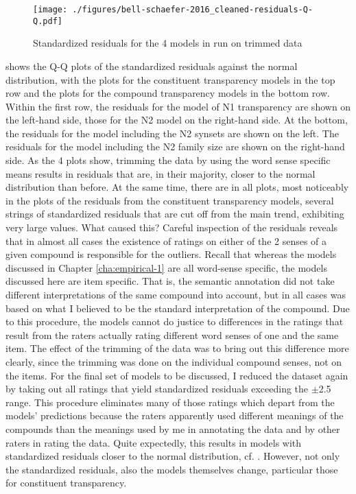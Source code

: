 \begin{figure}[!htb]
  \centering
\texttt{[image: ./figures/bell-schaefer-2016\_cleaned-residuals-Q-Q.pdf]}
  \caption{Standardized residuals for the 4 models in \citet{BellandSchaefer:2016} run on trimmed data}
\label{fig:bellschaefer2016_clean_models_residuals}
\end{figure}
\pagebreak[3]
 shows the Q-Q
plots of the standardized residuals against the normal distribution,
with the plots for the constituent transparency models in the top row
and the plots for the compound transparency models in the bottom
row. Within the first row, the residuals for the model of N1 transparency are shown on the left-hand
side, those for the N2 model on the right-hand side. At the bottom,
the residuals for the model including the N2 synsets are shown on the
left. The residuals for the model including the N2 family size are
shown on the right-hand side. 
As the 4 plots show, trimming the data by using the word sense
specific means results in residuals that are, in their majority,
closer to the normal distribution than before. At the same
time, there are in all plots, most noticeably in the plots of the
residuals from the constituent transparency models,
several strings of standardized residuals that are cut off from the main trend,
exhibiting very large values. What caused this? Careful inspection of
the residuals reveals that in almost all cases the existence of
ratings on either of the 2 senses of a given compound is responsible
for the outliers. Recall that whereas the models discussed in Chapter
\ref{cha:empirical-1} are all word-sense specific, the models
discussed here are item specific. That is, the semantic annotation did
not take different interpretations of the same compound into
account, but in all cases was based on what I believed to be the
standard interpretation of the compound. Due to this procedure, the
models cannot do justice to differences in the ratings that result
from the raters actually rating different word senses of one and the
same item. The effect of the trimming of the data was to bring out
this difference more clearly, since the trimming was done on the
individual compound senses, not on the items. For the final set of
models to be discussed, I reduced the dataset again by taking out all ratings that yield standardized residuals
exceeding the $\pm$2.5 range. This procedure eliminates many of those ratings which
depart from the models' predictions because the raters apparently used different
meanings of the compounds than the meanings used by me in annotating
the data and by other raters in rating the data. Quite
expectedly, this results in models with standardized residuals closer to
the normal distribution, cf. .   
However, not only the standardized residuals, also the models
themselves change, particular those for constituent transparency. 


